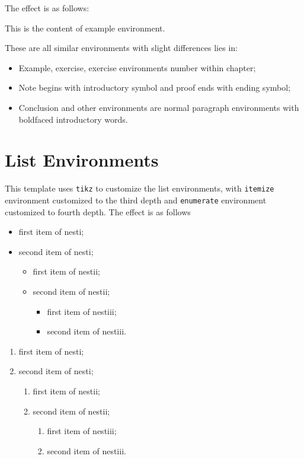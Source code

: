 \documentclass[11pt]{elegantbook}
\begin{document}
The effect is as follows:

\begin{example}
This is the content of example environment.
\end{example}

These are all similar environments with slight differences lies in:

\begin{itemize}
   \item Example, exercise, exercise environments number within chapter;
   \item Note begins with introductory symbol and proof ends with ending symbol;
   \item Conclusion and other environments are normal paragraph environments with boldfaced introductory words.
\end{itemize}


\section{List Environments}
This template uses \lstinline{tikz} to customize the list environments, with \lstinline{itemize} environment customized to the third depth and \lstinline{enumerate} environment customized to fourth depth. The effect is as follows\\[2ex]
\begin{minipage}[b]{0.49\textwidth}
\begin{itemize}
   \item first item of nesti;
   \item second item of nesti;
   \begin{itemize}
      \item first item of nestii;
      \item second item of nestii;
      \begin{itemize}
         \item first item of nestiii;
         \item second item of nestiii.
      \end{itemize}   
   \end{itemize}
\end{itemize}
\end{minipage}
\begin{minipage}[b]{0.49\textwidth}
\begin{enumerate}
   \item first item of nesti;
   \item second item of nesti;
   \begin{enumerate}
      \item first item of nestii;
      \item second item of nestii;
      \begin{enumerate}
         \item first item of nestiii;
         \item second item of nestiii.
      \end{enumerate}   
   \end{enumerate}
\end{enumerate}
\end{minipage}
\end{document}

